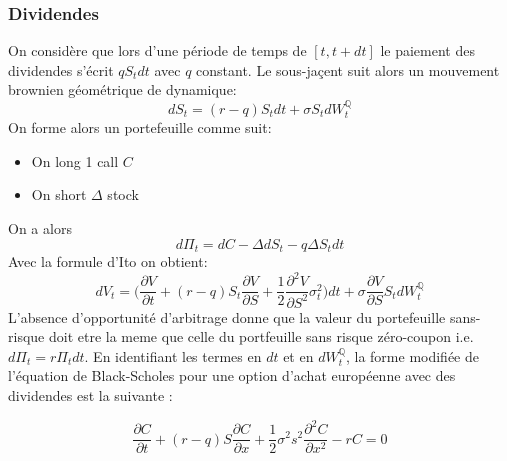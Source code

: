 \documentclass[a4paper]{article}
\begin{document}
\subsubsection{Dividendes}
On considère que lors d'une période de temps de $[t, t + d t]$ le paiement des dividendes s'écrit $qS_t dt$ avec $q$ constant.
Le sous-jaçent suit alors un mouvement brownien géométrique de dynamique:
\begin{equation}
    dS_t = (r-q)S_t dt + \sigma S_t dW_t^{\mathbb{Q}}
\end{equation}
On forme alors un portefeuille comme suit:
\begin{itemize}
    \item On long 1 call $C$
    \item On short $\Delta$ stock
\end{itemize}
On a alors 
\begin{equation}
    d \Pi_t = dC -\Delta dS_t - q\Delta S_t dt
\end{equation}
Avec la formule d'Ito on obtient:
\begin{equation}
   dV_t = \bigg(\frac{\partial V}{\partial t} + (r-q) S_t \frac{\partial V}{\partial S} + \frac{1}{2}\frac{\partial^2 V}{\partial S^2} \sigma_t^2 \bigg) dt + \sigma \frac{\partial V}{\partial S} S_t dW_t^{\mathbb{Q}} 
\end{equation}
L'absence d'opportunité d'arbitrage donne que la valeur du portefeuille sans-risque doit etre la meme que celle du portfeuille sans risque zéro-coupon i.e. $d\Pi_t = r\Pi_t dt$. En identifiant les termes en $dt$ et en $dW_t^{\mathbb{Q}}$, la forme modifiée de l'équation de Black-Scholes pour une option d'achat européenne avec des dividendes est la suivante :

\begin{equation*}
    \boxed{\frac{\partial C}{\partial t} + (r-q) S \frac{\partial C}{\partial x} + \frac{1}{2} \sigma ^2 {s}^2 \frac{\partial ^2 C}{\partial x^2}  - r C = 0}
\end{equation*}
\end{document}
